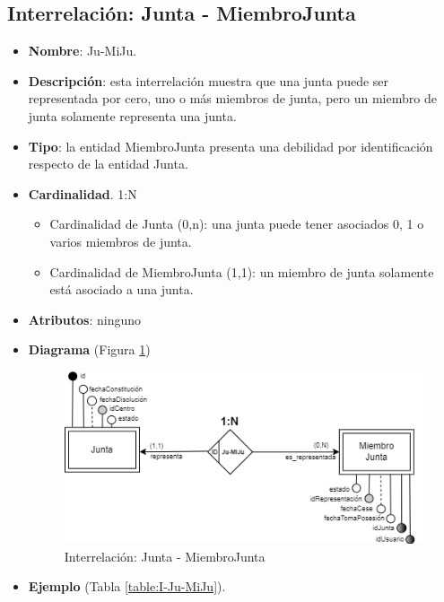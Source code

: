 \subsection{Interrelación: Junta - MiembroJunta}
\begin{itemize}
    \item \textbf{Nombre}: Ju-MiJu.
    \item \textbf{Descripción}: esta interrelación muestra que una junta puede ser representada por cero, uno o más miembros de junta, pero un miembro de junta solamente representa una junta.
    \item \textbf{Tipo}: la entidad MiembroJunta presenta una debilidad por identificación respecto de la entidad Junta.
    \item \textbf{Cardinalidad}. 1:N
    \begin{itemize}
        \item Cardinalidad de Junta (0,n): una junta puede tener asociados 0, 1 o varios miembros de junta.
        \item Cardinalidad de MiembroJunta (1,1): un miembro de junta solamente está asociado a una junta.
    \end{itemize}
    \item \textbf{Atributos}: ninguno
    \item \textbf{Diagrama} (Figura \ref{fig:I-Ju-MiJu}) 
    \begin{figure}[H]
        \centering
        \includegraphics[scale=0.7]{img/diagramas/EER/I-Ju-MiJu}
        \caption{Interrelación: Junta - MiembroJunta}
        \label{fig:I-Ju-MiJu}
    \end{figure}
    
    \item \textbf{Ejemplo} (Tabla \ref{table:I-Ju-MiJu}).


\end{itemize}
